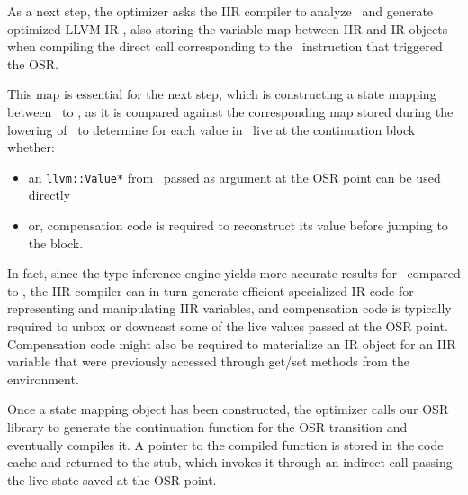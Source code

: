 As a next step, the optimizer asks the IIR compiler to analyze \gOptIIR\ and generate optimized LLVM IR \gOptIR, also storing the variable map between IIR and IR objects when compiling the direct call corresponding to the \feval\ instruction that triggered the OSR.

This map is essential for the next step, which is constructing a state mapping between \gIR\ to \gOptIR, as it is compared against the corresponding map stored during the lowering of \gbase\ to determine for each value in \gOptIR\ live at the continuation block whether:
\begin{itemize}
\item an {\tt llvm::Value*} from \gIR\ passed as argument at the OSR point can be used directly
\item or, compensation code is required to reconstruct its value before jumping to the block.
\end{itemize}

\noindent In fact, since the type inference engine yields more accurate results for \gOptIIR\ compared to \gIIR, the IIR compiler can in turn generate efficient specialized IR code for representing and manipulating IIR variables, and compensation code is typically required to unbox or downcast some of the live values passed at the OSR point. Compensation code might also be required to materialize an IR object for an IIR variable that were previously accessed through get/set methods from the environment.

Once a state mapping object has been constructed, the optimizer calls our OSR library to generate the continuation function for the OSR transition and eventually compiles it. A pointer to the compiled function is stored in the code cache and returned to the stub, which invokes it through an indirect call passing the live state saved at the OSR point.
